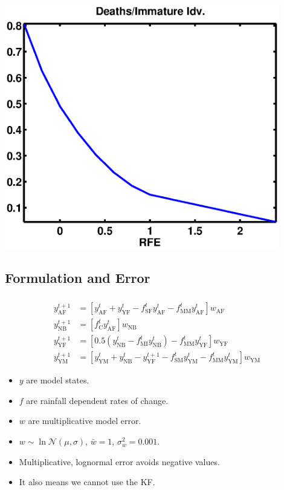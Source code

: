 \documentclass[mathserif]{beamer}
\begin{document}
\begin{frame}
  \begin{center}
    \frametitle{\insertsubsection}
    \includegraphics[width=0.9\textwidth]{mortImm}
  \end{center}
\end{frame}

\subsection{Formulation and Error}
\begin{frame}
  \begin{center}
    \frametitle{\insertsubsection}
    \begin{align}
      y_{\text{AF}}^{t+1} &= [y_{\text{AF}}^t + y_{\text{YF}}^t - f_{\text{SF}}^ty_{\text{AF}}^t - f_{\text{MM}}^ty_{\text{AF}}^t]w_{\text{AF}}\\
      y_{\text{NB}}^{t+1} &= [f_{\text{C}}^ty_{\text{AF}}^t]w_{\text{NB}}\\
      y_{\text{YF}}^{t+1} &= [0.5(y_{\text{NB}}^t - f_{\text{MI}}^ty_{\text{NB}}^t) - f_{\text{MM}}^ty_{\text{YF}}^t]w_{\text{YF}}\\
      y_{\text{YM}}^{t+1} &= [y_{\text{YM}}^t + y_{\text{NB}}^t - y_{\text{YF}}^{t+1} - f_{\text{SM}}^ty_{\text{YM}}^t - f_{\text{MM}}^ty_{\text{YM}}^t]w_{\text{YM}}
    \end{align}
  \end{center}
  \begin{itemize}
    \item $y$ are model states.
    \item $f$ are rainfall dependent rates of change.
    \item $w$ are multiplicative model error.
    \item $w\sim\ln\mathcal{N}(\mu,\sigma)$, $\bar{w}=1$, $\sigma_w^2 = 0.001$.
    \item Multiplicative, lognormal error avoids negative values.
    \item It also means we cannot use the KF.
  \end{itemize}
\end{frame}
\end{document}
